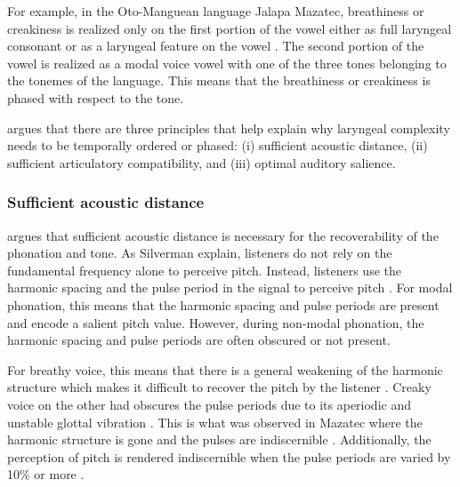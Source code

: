 For example, in the Oto-Manguean language Jalapa Mazatec, breathiness or creakiness is realized only on the first portion of the vowel either as full laryngeal consonant or as a laryngeal feature on the vowel \citep[238]{silvermanLaryngealComplexityOtomanguean1997}. The second portion of the vowel is realized as a modal voice vowel with one of the three tones belonging to the tonemes of the language. This means that the breathiness or creakiness is phased with respect to the tone.

\citeauthor{silvermanLaryngealComplexityOtomanguean1997} argues that there are three principles that help explain why laryngeal complexity needs to be temporally ordered or phased: (i) sufficient acoustic distance, (ii) sufficient articulatory compatibility, and (iii) optimal auditory salience. 

\subsubsection{Sufficient acoustic distance}\label{sec:sufficient_acoustic_distance}

\citet{silvermanLaryngealComplexityOtomanguean1997} argues that sufficient acoustic distance is necessary for the recoverability of the phonation and tone. As Silverman explain, listeners do not rely on the fundamental frequency alone to perceive pitch. Instead, listeners use the harmonic spacing and the pulse period in the signal to perceive pitch \citep{ritsmaFrequenciesDominantPerception1967,remezIntonationSinusoidalSentences1993}. For modal phonation, this means that the harmonic spacing and pulse periods are present and encode a salient pitch value. However, during non-modal phonation, the harmonic spacing and pulse periods are often obscured or not present.

For breathy voice, this means that there is a general weakening 
of the harmonic structure which makes it difficult to recover the pitch by the listener \citep{silvermanPhasingRecoverability1997}. Creaky voice on the other had obscures the pulse periods due to its aperiodic and unstable glottal vibration \citep{ladefogedSoundsWorldsLanguages1996}. This is what was observed in Mazatec where the harmonic structure is gone and the pulses are indiscernible \citep{kirkQuantifyingAcousticProperties1993}. Additionally, the perception of pitch is rendered indiscernible when the pulse periods are varied by 10\% or more \citep{rosenbergPitchDiscriminationJittered1966}.

